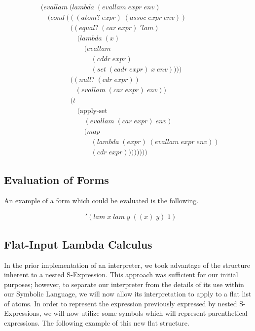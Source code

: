 \documentclass[11pt]{article}
\begin{document}
\begin{align*}
& (evallam \; (lambda \; (evallam \; expr \; env)
\\& \quad (cond \; (((atom? \; expr) \; (assoc \; expr \; env))
\\& \qquad \qquad \; ((equal? \; (car \; expr) \; 'lam) \; 
\\& \qquad \qquad \quad \; (lambda \; (x) \; 
\\& \qquad \qquad \qquad \; (evallam \; 
\\& \qquad \qquad \qquad \quad \; (cddr \; expr) \; 
\\& \qquad \qquad \qquad \quad \; (set \; (cadr \; expr) \; x \; env))))
\\& \qquad \qquad \; ((null? \; (cdr \; expr)) \; 
\\& \qquad \qquad \quad (evallam \; (car \; expr) \; env))
\\& \qquad \qquad \; (t \; 
\\& \qquad \qquad \quad \; (\text{apply-set} \; 
\\& \qquad \qquad \qquad \; (evallam \; (car \; expr) \; env) \; 
\\& \qquad \qquad \qquad \; (map \; 
\\& \qquad \qquad \qquad \quad \; (lambda \; (expr) \; (evallam \; expr \; env)) \; 
\\& \qquad \qquad \qquad \quad \; (cdr \; expr))))))))
\end{align*}

\subsection{Evaluation of Forms}
An example of a form which could be evaluated is the following.

\begin{align*}
& '(lam \; x \; lam \; y \; ((x) \; y) \; 1)
\end{align*}

\subsection{Flat-Input Lambda Calculus}
In the prior implementation of an interpreter, we took advantage of the structure inherent to a nested S-Expression. This approach was sufficient for our initial purposes; however, to separate our interpreter from the details of its use within our Symbolic Language, we will now allow its interpretation to apply to a flat list of atoms.
In order to represent the expression previously expressed by nested S-Expressions, we will now utilize some symbols which will represent parenthetical expressions. The following example of this new flat structure.
\end{document}
